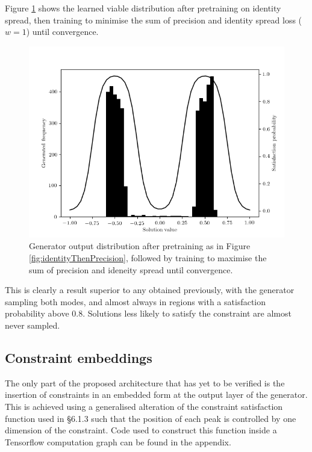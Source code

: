 \documentclass[../../main.tex]{subfiles}
\begin{document}
Figure \ref{fig:identityAndPrecision} shows the learned viable distribution after pretraining on identity spread, then training to minimise the sum of precision and identity spread loss ($w=1$) until convergence.
\begin{figure}[H]
    \begin{center}
    \includegraphics[width=\textwidth]{identityAndPrecision}
    \caption{
        Generator output distribution after pretraining as in Figure \ref{fig:identityThenPrecision}, followed by training to maximise the sum of precision and ideneity spread until convergence.
    }
    \label{fig:identityAndPrecision}
    \end{center}
\end{figure}
This is clearly a result superior to any obtained previously, with the generator sampling both modes, and almost always in regions with a satisfaction probability above $0.8$.
Solutions less likely to satisfy the constraint are almost never sampled.

\subsection{Constraint embeddings}

The only part of the proposed architecture that has yet to be verified is the insertion of constraints in an embedded form at the output layer of the generator.
This is achieved using a generalised alteration of the constraint satisfaction function used in \S6.1.3 such that the position of each peak is controlled by one dimension of the constraint.
Code used to construct this function inside a Tensorflow computation graph can be found in the appendix.
\end{document}
